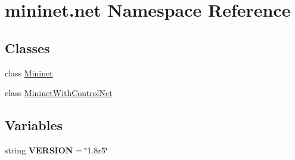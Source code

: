 \hypertarget{namespacemininet_1_1net}{\section{mininet.\-net Namespace Reference}
\label{namespacemininet_1_1net}
}
\subsection*{Classes}
\begin{DoxyCompactItemize}
\item 
class \hyperlink{classmininet_1_1net_1_1Mininet}{Mininet}
\item 
class \hyperlink{classmininet_1_1net_1_1MininetWithControlNet}{Mininet\-With\-Control\-Net}
\end{DoxyCompactItemize}
\subsection*{Variables}
\begin{DoxyCompactItemize}
\item 
\hypertarget{namespacemininet_1_1net_a70e4aef300bf237031171023f0b05326}{string {\bfseries V\-E\-R\-S\-I\-O\-N} = \char`\"{}1.\-8r5\char`\"{}}\label{namespacemininet_1_1net_a70e4aef300bf237031171023f0b05326}

\end{DoxyCompactItemize}


